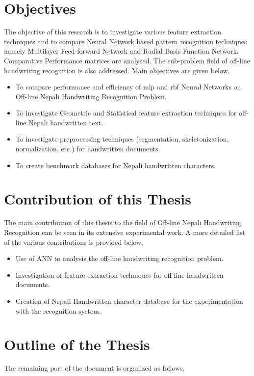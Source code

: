 \section{Objectives}
The objective of this research is to investigate various feature extraction techniques and to compare Neural Network based pattern recognition techniques namely Multilayer Feed-forward Network and Radial Basis Function Network. Comparative Performance matrices are analysed. The sub-problem field of off-line handwriting recognition is also addressed. Main objectives are given below.
\begin{itemize}
\item  To compare performance and efficiency of \ac{mlp} and \ac{rbf} Neural Networks on Off-line Nepali Handwriting Recognition Problem.
\item To investigate Geometric and Statistical feature extraction techniques for off-line Nepali handwritten text.
\item To investigate preprocessing techniques (segmentation, skeletonization, normalization, etc.) for handwritten documents.
\item To create benchmark databases for Nepali handwritten characters.
\end{itemize}

\section{Contribution of this Thesis}
The main contribution of this thesis to the field of Off-line Nepali Handwriting Recognition can be seen in its extensive experimental work. A more detailed list of the various contributions is provided below,

\begin{itemize}
\itemsep0em
\item Use of ANN to analysis the off-line handwriting recognition problem.
\item Investigation of feature extraction techniques for off-line handwritten documents.
\item Creation of Nepali Handwritten character database for the experimentation with the recognition system.
\end{itemize}

\section{Outline of the Thesis}
The remaining part of the document is organized as follows,\par

